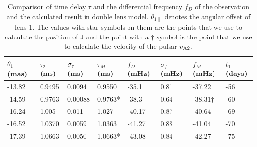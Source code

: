 \documentclass[useAMS,usenatbib]{mn2e}
\begin{document}
\begin{table}
\centering
\begin{tabular}{llllllll}
\hline
$\theta_{1\parallel}$ (mas)  & $\tau_2$(ms) & $\sigma_{\rm \tau}$(ms)  & $\tau_M$(ms) & $f_D$(mHz)  &$\sigma_{f}$(mHz)      &  $f_M$(mHz)& $t_1$(days) \\ \hline
-13.82  &    0.9495     &0.0094    & 0.9550       & -35.1     &0.81    & -37.22          & -56\\ 
-14.59  &   0.9763    &0.00088   & 0.9763*       & -38.3     &0.64    & -38.31$\dagger$ & -60\\ 
-16.24  &   1.005    &0.011   & 1.027          & -40.17    &0.87   & -40.64          & -69\\ 
-16.52  &    1.0370     &0.0059    & 1.0363       & -41.27    &0.88   & -41.04          & -70\\ 
-17.39  &  1.0663     &0.0050    & 1.0663*        & -43.08    &0.84   & -42.27           & -75\\ \hline
\end{tabular}
\caption{Comparison of time delay $\tau$ and the differential frequency $f_D$ of the observation and the calculated result in double lens model. $\theta_{1\parallel}$ denotes the angular offset of lens 1. 
The values with star symbols on them are the points that we use to calculate the position of J and the point with a $\dagger$ symbol is the point that we use to calculate the velocity of the pulsar $v_{\rm A2}$. }
\label{table:double_lens_compare}
\end{table}
\end{document}
